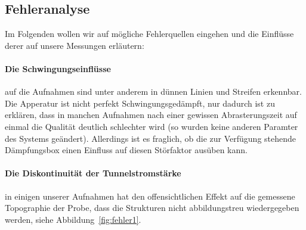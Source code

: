 \subsection{Fehleranalyse}
Im Folgenden wollen wir auf mögliche Fehlerquellen eingehen und die Einflüsse derer
auf unsere Messungen erläutern:
\paragraph{Die Schwingungseinflüsse} auf die Aufnahmen sind unter anderem in dünnen Linien
und Streifen erkennbar. Die Apperatur ist nicht perfekt Schwingungsgedämpft, nur dadurch
ist zu erklären, dass in manchen Aufnahmen nach einer gewissen Abrasterungszeit auf einmal
die Qualität deutlich schlechter wird (so wurden keine anderen Paramter des Systems geändert).
Allerdings ist es fraglich, ob die zur Verfügung stehende Dämpfungsbox einen Einfluss
auf diesen Störfaktor ausüben kann. 
\paragraph{Die Diskontinuität der Tunnelstromstärke} in einigen unserer Aufnahmen hat den
offensichtlichen Effekt auf die gemessene Topographie der Probe, dass die Strukturen nicht
abbildungstreu wiedergegeben werden, siehe Abbildung~\ref{fig:fehler1}. 

